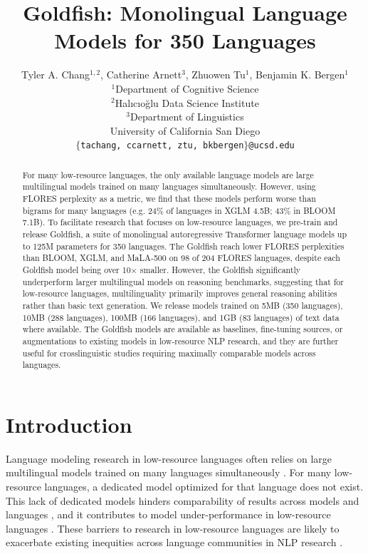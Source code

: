\documentclass[11pt]{article}
\title{Goldfish: Monolingual Language Models for 350 Languages}
\author{Tyler A. Chang$^{1,2}$, \quad Catherine Arnett$^3$, \quad Zhuowen Tu$^1$, \quad Benjamin K. Bergen$^1$ \\
$^1$Department of Cognitive Science \\
$^2${Halıcıoğlu} Data Science Institute \\
$^3$Department of Linguistics \\
University of California San Diego \\
{\texttt{$\{$tachang, ccarnett, ztu, bkbergen$\}$@ucsd.edu}}
}
\begin{document}
\maketitle
\begin{abstract}
For many low-resource languages, the only available language models are large multilingual models trained on many languages simultaneously.
However, using FLORES perplexity as a metric, we find that these models perform worse than bigrams for many languages (e.g. 24\% of languages in XGLM 4.5B; 43\% in BLOOM 7.1B).
To facilitate research that focuses on low-resource languages, we pre-train and release Goldfish, a suite of monolingual autoregressive Transformer language models up to 125M parameters for 350 languages.
The Goldfish reach lower FLORES perplexities than BLOOM, XGLM, and \mbox{MaLA-500} on 98 of 204 FLORES languages, despite each Goldfish model being over 10$\times$ smaller.
However, the Goldfish significantly underperform larger multilingual models on reasoning benchmarks, suggesting that for low-resource languages, multilinguality primarily improves general reasoning abilities rather than basic text generation.
We release models trained on 5MB (350 languages), 10MB (288 languages), 100MB (166 languages), and 1GB (83 languages) of text data where available.
The Goldfish models are available as baselines, fine-tuning sources, or augmentations to existing models in low-resource NLP research, and they are further useful for crosslinguistic studies requiring maximally comparable models across languages.
\end{abstract}

\section{Introduction}
Language modeling research in low-resource languages often relies on large multilingual models trained on many languages simultaneously \citep{conneau-etal-2020-unsupervised,adelani-etal-2021-masakhaner,ebrahimi2021americasnli,lin2022xglm,hangya2022improving,imanigooghari-etal-2023-glot500}.
For many low-resource languages, a dedicated model optimized for that language does not exist.
This lack of dedicated models hinders comparability of results across models and languages \citep{bandarkar2024belebele}, and it contributes to model under-performance in low-resource languages \citep{wu-dredze-2020-languages,blasi2022systematic}.
These barriers to research in low-resource languages are likely to exacerbate existing inequities across language communities in NLP research \citep{bender2011achieving,joshi-etal-2020-state}.
\end{document}
